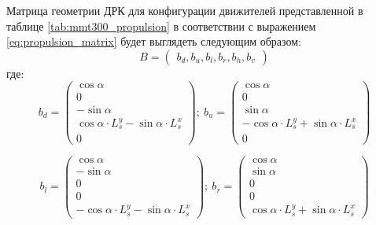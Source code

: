 Матрица геометрии ДРК для конфигурации движителей представленной в таблице \ref{tab:mmt300_propulsion} в соответствии с выражением \ref{eq:propulsion_matrix} будет выглядеть следующим образом:
\begin{equation}
    \label{eq:mmt300_propulsion_matrix}
    B = 
    \begin{pmatrix}
        b_d, b_u, b_l, b_r, b_h, b_v
    \end{pmatrix}
\end{equation}
\noindent где:
\begin{equation*}
    b_d = 
    \begin{pmatrix}
        \cos{\alpha} \\
        0 \\
        -\sin{\alpha} \\
        \cos{\alpha} \cdot L_s^y - \sin{\alpha} \cdot L_s^x \\
        0
    \end{pmatrix}
    ;\:
    b_u = 
    \begin{pmatrix}
        \cos{\alpha} \\
        0 \\
        \sin{\alpha} \\
        -\cos{\alpha} \cdot L_s^y + \sin{\alpha} \cdot L_s^x \\
        0
    \end{pmatrix}
\end{equation*}

\begin{equation*}
    b_l = 
    \begin{pmatrix}
        \cos{\alpha} \\
        -\sin{\alpha} \\
        0 \\
        0 \\
        -\cos{\alpha} \cdot L_s^y - \sin{\alpha} \cdot L_s^x
    \end{pmatrix}
    ;\:
    b_r = 
    \begin{pmatrix}
        \cos{\alpha} \\
        \sin{\alpha} \\
        0 \\
        0 \\
        \cos{\alpha} \cdot L_s^y +  \sin{\alpha} \cdot L_s^x
    \end{pmatrix}
\end{equation*}

